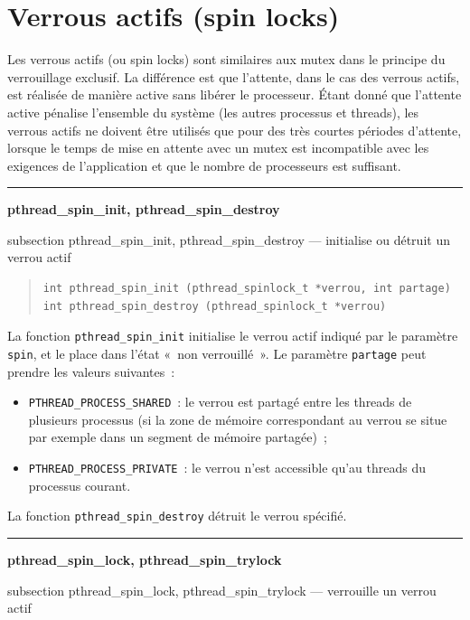 \documentclass [twoside] {report}
\newcommand {\primitive} [1]
    {
	\phantomsection
	{\large \textbf {#1}}
	\addcontentsline {toc} {subsection} {#1}
    }
\newcommand {\separation}
    {
	\vspace {5mm}
	\nopagebreak
	\hrule
    }
\begin{document}
\section {Verrous actifs (spin locks)}

Les verrous actifs (ou spin locks) sont similaires aux mutex dans le
principe du verrouillage exclusif. La différence est que l'attente,
dans le cas des verrous actifs, est réalisée de manière active sans
libérer le processeur. Étant donné que l'attente active pénalise
l'ensemble du système (les autres processus et threads), les verrous
actifs ne doivent être utilisés que pour des très courtes périodes
d'attente, lorsque le temps de mise en attente avec un mutex est
incompatible avec les exigences de l'application et que le nombre de
processeurs est suffisant.

\separation
\primitive {pthread\_spin\_init, pthread\_spin\_destroy} --- initialise ou détruit un verrou actif

\begin {quote}
\begin {verbatim}
int pthread_spin_init (pthread_spinlock_t *verrou, int partage)
int pthread_spin_destroy (pthread_spinlock_t *verrou)
\end{verbatim}
\end {quote}

La fonction \verb|pthread_spin_init| initialise le verrou actif indiqué
par le paramètre \texttt {spin}, et le place dans l'état «~non
verrouillé~».  Le paramètre \texttt {partage} peut prendre les
valeurs suivantes~:

\begin {itemize}
    \item \verb|PTHREAD_PROCESS_SHARED|~: le verrou
	est partagé entre les threads de plusieurs processus (si la zone
	de mémoire correspondant au verrou se situe par exemple dans un
	segment de mémoire partagée)~;
    \item \verb|PTHREAD_PROCESS_PRIVATE|~: le verrou n'est accessible
	qu'au threads du processus courant.
\end {itemize}

La fonction \verb|pthread_spin_destroy| détruit le verrou spécifié.


\separation
\primitive {pthread\_spin\_lock, pthread\_spin\_trylock} --- verrouille un verrou actif
\end{document}
